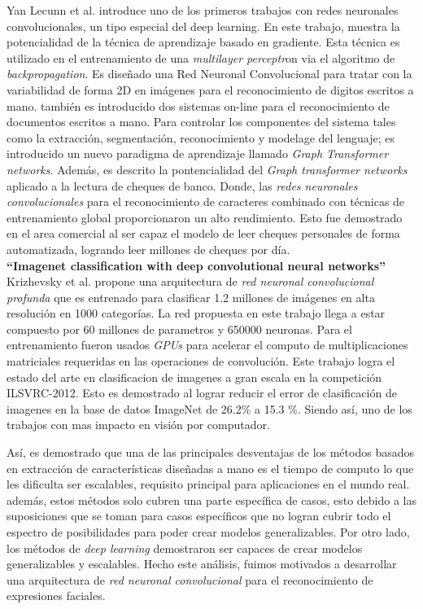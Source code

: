  Yan Lecunn  et al. introduce uno de los primeros trabajos con redes neuronales convolucionales, un tipo especial del deep learning. En este trabajo, muestra la potencialidad de la técnica de aprendizaje basado en gradiente. Esta técnica es utilizado en el entrenamiento de una \textit{multilayer perceptr}on via el algoritmo de \textit{backpropagation}. Es diseñado una Red Neuronal Convolucional para tratar con la variabilidad de forma 2D en imágenes para el reconocimiento de digitos escritos a mano. también es introducido dos sistemas on-line para el reconocimiento de documentos escritos a mano. Para controlar los componentes del sistema tales como la extracción, segmentación, reconocimiento y modelage del lenguaje; es introducido un nuevo paradigma de aprendizaje llamado \textit{Graph Transformer networks}. Además, es descrito la pontencialidad del \textit{Graph transformer networks} aplicado a la lectura de cheques de banco. Donde, las \textit{redes neuronales convolucionales} para el reconocimiento de caracteres combinado con técnicas de entrenamiento global proporcionaron un alto rendimiento. Esto fue demostrado en el area comercial al ser capaz el modelo de leer cheques personales de forma automatizada, logrando leer millones de cheques por día. \\
 
 \textbf{“Imagenet classification with deep convolutional neural networks” \cite{8krizhevsky2012imagenet}}\\
 
Krizhevsky et al. propone una arquitectura de \textit{red neuronal convolucional profunda} que es entrenado para clasificar 1.2 millones de imágenes en alta resolución en 1000 categorías. La red propuesta en este trabajo llega a estar compuesto por 60 millones de parametros y 650000 neuronas. Para el entrenamiento fueron usados \textit{GPUs} para acelerar el computo de multiplicaciones matriciales requeridas en las operaciones de convolución. Este trabajo logra el estado del arte en clasificacion de imagenes a gran escala en la competición ILSVRC-2012. Esto es demostrado al lograr reducir el error de clasificación de imagenes en la base de datos ImageNet de 26.2\% a 15.3 \%. Siendo así, uno de los trabajos con mas impacto en visión por computador. 

Así, es demostrado que una de las principales desventajas de los métodos basados en extracción de características diseñadas a mano es el tiempo de computo lo que les dificulta ser escalables, requisito principal para aplicaciones en el mundo real. además, estos métodos solo cubren una parte específica de casos, esto debido a las suposiciones que se toman para casos específicos que no logran cubrir todo el espectro de posibilidades para poder crear modelos generalizables. Por otro lado, los métodos de \textit{deep learning} demostraron ser capaces de crear modelos generalizables y escalables. Hecho este análisis, fuimos motivados a desarrollar una arquitectura de \textit{red neuronal convolucional} para el reconocimiento de expresiones faciales.

